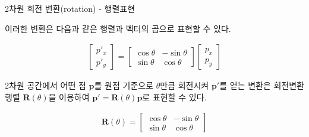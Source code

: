 \documentclass{beamer}
\begin{document}
\begin{frame}{2차원 회전 변환(rotation) - 행렬표현}

이러한 변환은 다음과 같은 행렬과 벡터의 곱으로 표현할 수 있다.

\begin{eqnarray}
\left [
\begin{array}{c}
p'_x \\ p'_y
\end{array}
\right ] =
\left [
\begin{array}{cc}
\cos \theta & - \sin \theta \\
\sin \theta & \cos \theta
\end{array}
\right ]
\left [
\begin{array}{c}
p_x \\
p_y
\end{array}
\right ] \nonumber
\end{eqnarray}

2차원 공간에서 어떤 점 $\mathbf p$를 원점 기준으로 $\theta$만큼 회전시켜 $\mathbf p'$를 얻는 변환은 회전변환 행렬 $\mathbf R(\theta)$을
이용하여 $\mathbf p' = \mathbf R(\theta) \mathbf p$로 표현할 수 있다.

\begin{eqnarray}
\mathbf R(\theta) = \left [ 
\begin{array}{cc}
\cos \theta & - \sin \theta \\
\sin \theta & \cos \theta
\end{array}
\right ] \nonumber
\end{eqnarray} 

\end{frame}
\end{document}
